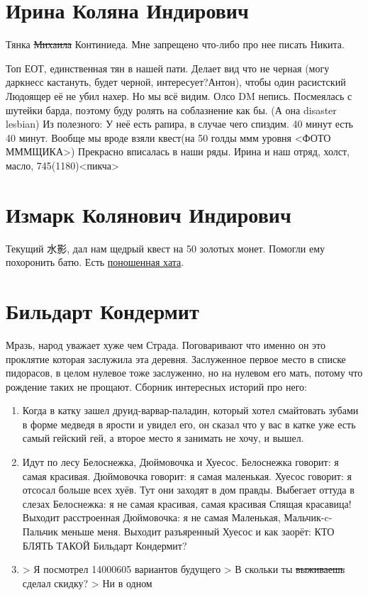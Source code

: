 \documentclass[letterpaper,twocolumn,openany,nodeprecatedcode]{dndbook}
\begin{document}
\section{Ирина Коляна Индирович}\label{sec:irina_kolyana}

Тянка \sout{Михаила} Континиеда. Мне запрещено что-либо про нее писать \textcopyright Никита. 

Топ ЕОТ, единственная тян в нашей пати. Делает вид что не черная (могу даркнесс кастануть, будет черной, интересует?\textcopyright Антон), чтобы один расистский Людоящер её не убил нахер. Но мы всё видим. Олсо DM непись. Посмеялась с шутейки барда, поэтому буду ролять на соблазнение как бы. (А она disaster lesbian) Из полезного:
У неё есть рапира, в случае чего спиздим.
40 минут есть 40 минут.
Вообще мы вроде взяли квест(на 50 голды ммм уровня <ФОТО МММЩИКА>)
Прекрасно вписалась в наши ряды. Ирина и наш отряд, холст, масло, 745(1180)<пикча>

\section{Измарк Колянович Индирович}\label{sec:ismark_kolyanovich}

Текущий 水影, дал нам щедрый квест на 50 золотых монет. Помогли ему похоронить батю. Есть \hyperref[sec:vilage:homie]{поношенная хата}.

\section{Бильдарт Кондермит}

Мразь, народ уважает хуже чем Страда. Поговаривают что именно он это проклятие которая заслужила эта деревня. Заслуженное первое место в списке пидорасов, в целом нулевое тоже заслуженно, но на нулевом его мать, потому что рождение таких не прощают.
Сборник интересных историй про него:
\begin{enumerate}
    \item Когда в катку зашел друид-варвар-паладин, который хотел смайтовать зубами в форме медведя в ярости и увидел его, он сказал что у вас в катке уже есть самый гейский гей, а второе место я занимать не хочу, и вышел.
    
    \item 
        Идут по лесу Белоснежка, Дюймовочка и Хуесос. 
            Белоснежка говорит: 
                я самая красивая. 
            Дюймовочка говорит: 
                я самая маленькая. 
            Хуесос говорит: 
                я отсосал больше всех хуёв. 
        Тут они заходят в дом правды. 
            Выбегает оттуда в слезах Белоснежка: 
                я не самая красивая,
                    самая красивая Спящая красавица! 
            Выходит расстроенная Дюймовочка:
                я не самая Маленькая, 
                    Мальчик-c-Пальчик меньше меня.
            Выходит разъяренный Хуесос и как заорёт: 
                КТО БЛЯТЬ ТАКОЙ Бильдарт Кондермит?
    
    \item > Я посмотрел 14000605 вариантов будущего
    > В скольки ты \sout{выживаешь} сделал скидку?
    > Ни в одном
\end{enumerate}
\end{document}
